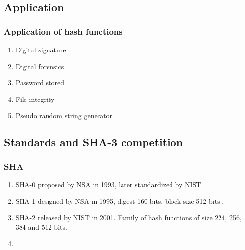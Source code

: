 \documentclass{beamer}
\begin{document}

\subsection{Application}
\begin{frame}
\frametitle{Application of hash functions}
\begin{enumerate}
\item Digital signature
\item Digital forensics \footnotemark
\item Password stored 
\item File integrity
\item Pseudo random string generator
\end{enumerate}
\end{frame}

\subsection{Standards and SHA-3 competition}

\begin{frame}
  \frametitle{SHA}
  \begin{enumerate}
    \item SHA-0 proposed by NSA in 1993, later standardized by NIST.
    \item SHA-1 designed by NSA in 1995, digest 160 bits, block size 512 bits \footnotemark.
    \item SHA-2 released by NIST in 2001. Family of hash functions of size 224, 256, 384 and 512 bits.
    \item 
  \end{enumerate}
\end{frame}
\end{document}
